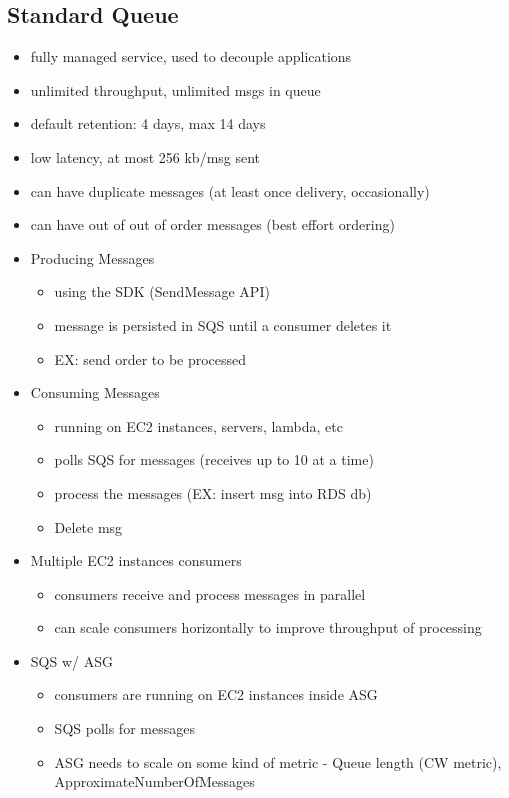 \documentclass[]{scrartcl}
\begin{document}
\subsection{Standard Queue}
\begin{itemize}
	\item fully managed service, used to decouple applications
	\item unlimited throughput, unlimited msgs in queue
	\item default retention: 4 days, max 14 days
	\item low latency, at most 256 kb/msg sent
	\item can have duplicate messages (at least once delivery, occasionally)
	\item can have out of out of order messages (best effort ordering)
	\item Producing Messages
	\begin{itemize}
		\item using the SDK (SendMessage API)
		\item message is persisted in SQS until a consumer deletes it
		\item EX: send order to be processed
	\end{itemize}
	\item Consuming Messages
	\begin{itemize}
		\item running on EC2 instances, servers, lambda, etc
		\item polls SQS for messages (receives up to 10 at a time)
		\item process the messages (EX: insert msg into RDS db)
		\item Delete msg
	\end{itemize}
	\item Multiple EC2 instances consumers
	\begin{itemize}
		\item consumers receive and process messages in parallel
		\item can scale consumers horizontally to improve throughput of processing
	\end{itemize}
	\item SQS w/ ASG
	\begin{itemize}
		\item consumers are running on EC2 instances inside ASG
		\item SQS polls for messages
		\item ASG needs to scale on some kind of metric - Queue length (CW metric), ApproximateNumberOfMessages

\end{itemize}
\end{itemize}
\end{document}

